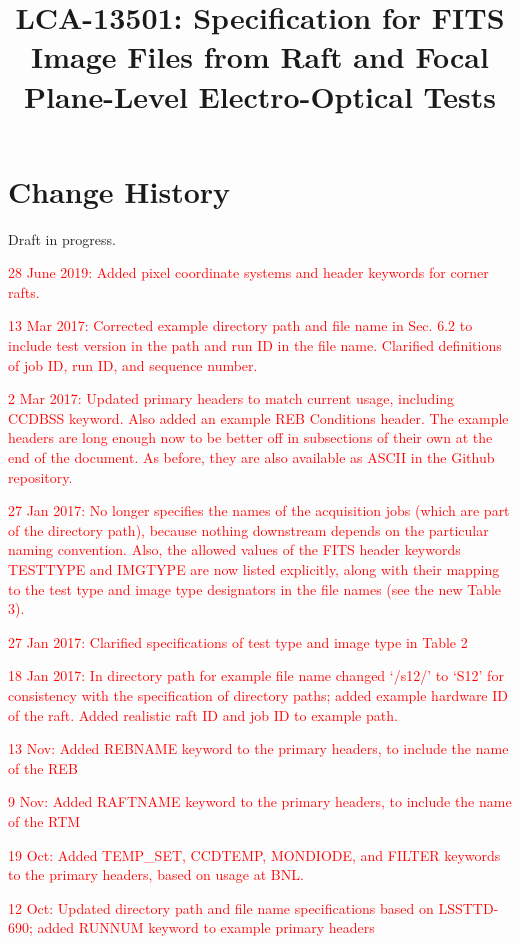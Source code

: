 \documentclass{article}[12pt]
\title{LCA-13501:  Specification for FITS Image Files from Raft and Focal Plane-Level Electro-Optical Tests}
\newcommand{\red}{\textcolor{red}}
\begin{document}
\maketitle
\tableofcontents
\newpage
\listoftables

\section{Change History}
Draft in progress. %

\red{28 June 2019:  Added pixel coordinate systems and header keywords for corner rafts.}

\red{13 Mar 2017:  Corrected example directory path and file name in Sec. 6.2 to include test version in the path and run ID in the file name.  Clarified definitions of job ID, run ID, and sequence number.}

\red{2 Mar 2017:   Updated primary headers to match current usage, including CCDBSS keyword.  Also added an example REB Conditions header.  The example headers are long enough now to be better off in subsections of their own at the end of the document.  As before, they are also available as ASCII in the Github repository.}

\red{27 Jan 2017:  No longer specifies the names of the acquisition jobs (which are part of the directory path), because nothing downstream depends on the particular naming convention.  Also, the allowed values of the FITS header keywords TESTTYPE and IMGTYPE are now listed explicitly, along with their mapping to the test type and image type designators in the file names (see the new Table 3).}

\red{27 Jan 2017:  Clarified specifications of test type and image type in Table 2}

\red{18 Jan 2017:  In directory path for example file name changed `/s12/' to `S12' for consistency with the specification of directory paths; added example hardware ID of the raft.  Added realistic raft ID and job ID to example path.}

\red{13 Nov: Added REBNAME keyword to the primary headers, to include the name of the REB}

\red{9 Nov: Added RAFTNAME keyword to the primary headers, to include the name of the RTM}

\red{19 Oct:  Added TEMP\_SET, CCDTEMP, MONDIODE, and FILTER keywords to the primary headers, based on usage at BNL.}

\red{12 Oct:  Updated directory path and file name specifications based on LSSTTD-690; added RUNNUM keyword to example primary headers}
\end{document}
